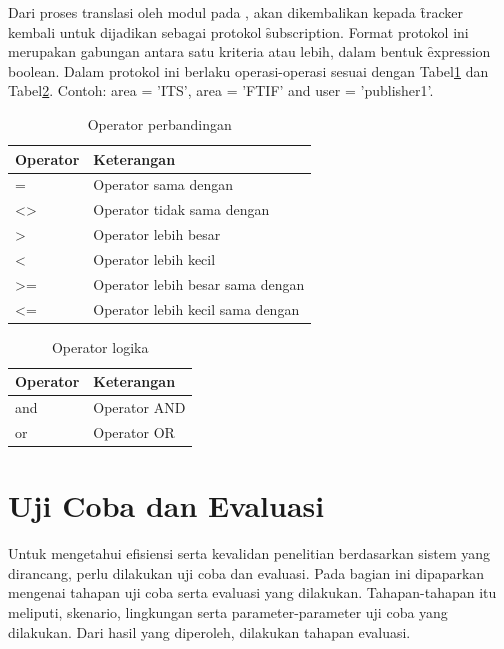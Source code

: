 Dari proses translasi oleh modul pada \broker, akan dikembalikan kepada
\f{tracker} kembali untuk dijadikan sebagai protokol \f{subscription}. Format
protokol ini merupakan gabungan antara satu kriteria atau lebih, dalam bentuk
\f{expression boolean}. Dalam protokol ini berlaku operasi-operasi sesuai dengan
Tabel\ref{tab:operator-comparison} dan Tabel\ref{tab:operator-logical}. Contoh:
area = 'ITS', area = 'FTIF' and user = 'publisher1'.

\begin{table}
\centering
\caption{Operator perbandingan}
\label{tab:operator-comparison}
\begin{tabular}{l l}
  \hline
  Operator & Keterangan \\
  \hline
  = & Operator sama dengan \\
  <> & Operator tidak sama dengan \\
  \textgreater{} & Operator lebih besar \\
  \textless{} & Operator lebih kecil \\
  \textgreater{}= & Operator lebih besar sama dengan \\
  \textless{}= & Operator lebih kecil sama dengan \\
  \hline
\end{tabular}
\end{table}

\begin{table}
\centering
\caption{Operator logika}
\label{tab:operator-logical}
\begin{tabular}{l l}
    \hline
    Operator & Keterangan \\
    \hline
    and & Operator AND \\
    or & Operator OR \\
    \hline
\end{tabular}
\end{table}



\section{Uji Coba dan Evaluasi} Untuk mengetahui efisiensi serta kevalidan
penelitian berdasarkan sistem yang dirancang, perlu dilakukan uji coba dan
evaluasi. Pada bagian ini dipaparkan mengenai tahapan uji coba serta evaluasi
yang dilakukan. Tahapan-tahapan itu meliputi, skenario, lingkungan serta
parameter-parameter uji coba yang dilakukan. Dari hasil yang diperoleh,
dilakukan tahapan evaluasi.


